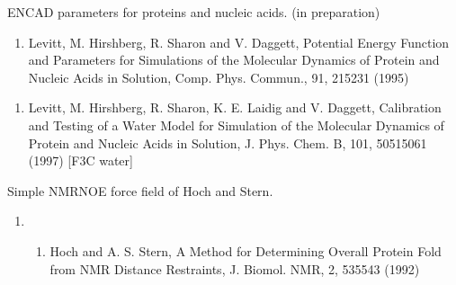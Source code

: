 \documentclass[letterpaper,11pt,english]{sphinxmanual}
\begin{document}

ENCAD parameters for proteins and nucleic acids.  (in preparation)
\begin{enumerate}
%
\setcounter{enumi}{12}
\item {} 
Levitt, M. Hirshberg, R. Sharon and V. Daggett, Potential Energy Function and Parameters for Simulations of the Molecular Dynamics of Protein and Nucleic Acids in Solution, Comp. Phys. Commun., 91, 215\sphinxhyphen{}231 (1995)

\end{enumerate}
\begin{enumerate}
%
\setcounter{enumi}{12}
\item {} 
Levitt, M. Hirshberg, R. Sharon, K. E. Laidig and V. Daggett, Calibration and Testing of a Water Model for Simulation of the Molecular Dynamics of Protein and Nucleic Acids in Solution, J. Phys. Chem. B, 101, 5051\sphinxhyphen{}5061 (1997)  {[}F3C water{]}

\end{enumerate}


Simple NMR\sphinxhyphen{}NOE force field of Hoch and Stern.
\begin{enumerate}
%
\setcounter{enumi}{9}
\item {} \begin{enumerate}
%
\setcounter{enumii}{2}
\item {} 
Hoch and A. S. Stern, A Method for Determining Overall Protein Fold from NMR Distance Restraints, J. Biomol. NMR, 2, 535\sphinxhyphen{}543 (1992)

\end{enumerate}

\end{enumerate}

\end{document}
